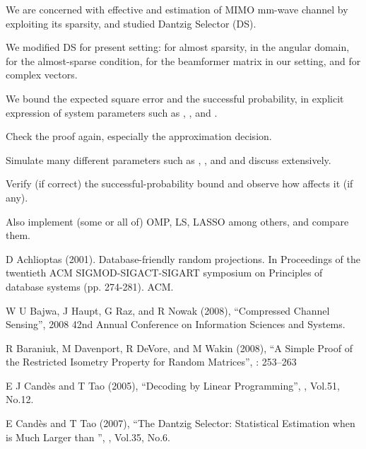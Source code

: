 {
\I We are concerned with effective and estimation of MIMO mm-wave channel by exploiting its sparsity, and studied Dantzig Selector (DS).

\I We modified DS for present setting: for almost sparsity, in the angular domain, for the almost-sparse condition, for the beamformer matrix in our setting, and for complex vectors.

\I We bound the expected square error and the successful probability, in explicit expression of system parameters such as , , and .
}
{
\I Check the proof again, especially the approximation decision.

\I Simulate many different parameters such as , , and  and discuss extensively.

\I Verify (if correct) the successful-probability bound and observe how  affects it (if any).

\I Also implement (some or all of) OMP, LS, LASSO among others, and compare them.
}
{
{\tfx
\I D Achlioptas (2001). Database-friendly random projections. In Proceedings of the twentieth ACM SIGMOD-SIGACT-SIGART symposium on Principles of database systems (pp. 274-281). ACM.

\I W U Bajwa, J Haupt, G Raz, and R Nowak (2008), ``Compressed Channel Sensing'', 2008 42nd Annual Conference on Information Sciences and Systems.

\I R Baraniuk, M Davenport, R DeVore, and M Wakin (2008), ``A Simple Proof of the Restricted Isometry Property for Random Matrices'',  : 253–263

\I E J Cand\`es and T Tao (2005), ``Decoding by Linear Programming'', , Vol.51, No.12.

\I E Cand\`es and T Tao (2007), ``The Dantzig Selector: Statistical Estimation when  is Much Larger than '', , Vol.35, No.6.
}
}


